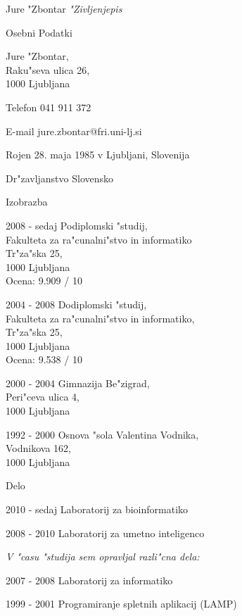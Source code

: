 \documentclass[12pt,a4paper]{article}
\begin{document}
\begin{cv}{Jure "Zbontar}
\noindent \emph{"Zivljenjepis}

\begin{cvlist}{Osebni Podatki}
\item Jure "Zbontar, \\
Raku"seva ulica 26, \\
1000 Ljubljana

\item[Telefon] 041 911 372 
\item[E-mail] jure.zbontar@fri.uni-lj.si

\item[Rojen] 28. maja 1985 v Ljubljani, Slovenija
\item[Dr"zavljanstvo] Slovensko

\end{cvlist}

\begin{cvlist}{Izobrazba}
\item[2008 - sedaj] Podiplomski "studij,\\
Fakulteta za ra"cunalni"stvo in informatiko \\
Tr"za"ska 25, \\
1000 Ljubljana \\
Ocena: 9.909 / 10

\item[2004 - 2008] Dodiplomski "studij,\\
Fakulteta za ra"cunalni"stvo in informatiko, \\
Tr"za"ska 25, \\
1000 Ljubljana \\
Ocena: 9.538 / 10

\item[2000 - 2004] Gimnazija Be"zigrad, \\
Peri"ceva ulica 4, \\
1000 Ljubljana

\item[1992 - 2000] Osnova "sola Valentina Vodnika, \\
Vodnikova 162, \\
1000 Ljubljana
\end{cvlist}

\begin{cvlist}{Delo}
\item[2010 - sedaj] Laboratorij za bioinformatiko
\item[2008 - 2010] Laboratorij za umetno inteligenco
\item \textit{V "casu "studija sem opravljal razli"cna dela:}
\item[2007 - 2008] Laboratorij za informatiko
\item[1999 - 2001] Programiranje spletnih aplikacij (LAMP)
\end{cvlist}


\end{cv}
\end{document}
